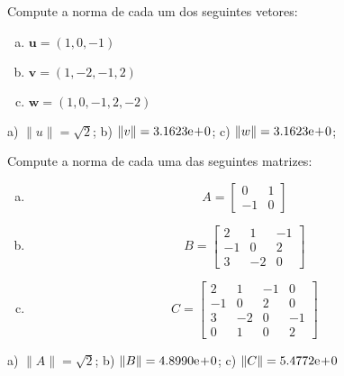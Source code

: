 \begin{exer}
  Compute a norma de cada um dos seguintes vetores:
  \begin{enumerate}[a)]
  \item $\displaystyle \pmb{u} = (1, 0, -1)$
  \item $\displaystyle \pmb{v} = (1, -2, -1, 2)$
  \item $\displaystyle \pmb{w} = (1, 0, -1, 2, -2)$
  \end{enumerate}
\end{exer}
\begin{resp}
  a) $\|u\| = \sqrt{2}$; b) $\|v\| = 3.1623\mathrm{e}\!+\!0$; c) $\|w\| = 3.1623\mathrm{e}\!+\!0$;
\end{resp}

\begin{exer}
  Compute a norma de cada uma das seguintes matrizes:
  \begin{enumerate}[a)]
  \item
    \begin{equation}
      A =
      \begin{bmatrix}
        0 & 1\\
        -1 & 0
      \end{bmatrix}
    \end{equation}
  \item 
    \begin{equation}
      B =
      \begin{bmatrix}
        2 & 1 & -1\\
        -1 & 0 & 2\\
        3 & -2 & 0
      \end{bmatrix}
    \end{equation}
  \item 
    \begin{equation}
      C =
      \begin{bmatrix}
        2 & 1 & -1 & 0\\
        -1 & 0 & 2 & 0\\
        3 & -2 & 0 & -1\\
        0 & 1 & 0 & 2
      \end{bmatrix}
    \end{equation}
  \end{enumerate}
\end{exer}
\begin{resp}
  a) $\|A\| = \sqrt{2}$; b) $\|B\| = 4.8990\mathrm{e}\!+\!0$; c) $\|C\| = 5.4772\mathrm{e}\!+\!0$
\end{resp}

